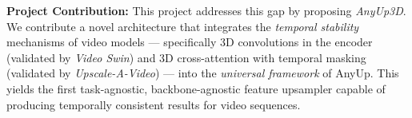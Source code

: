 \textbf{Project Contribution:}
This project addresses this gap by proposing
\textit{AnyUp3D}.
We contribute a novel architecture that integrates the
\emph{temporal stability} mechanisms of video models ---
specifically 3D convolutions in the encoder (validated by
\textit{Video Swin}) and 3D cross-attention with temporal masking
(validated by \textit{Upscale-A-Video}) --- into the
\emph{universal framework} of AnyUp.
This yields the first task-agnostic, backbone-agnostic feature
upsampler capable of producing temporally consistent results
for video sequences.




